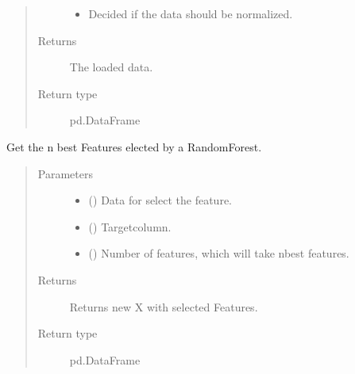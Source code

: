 \documentclass[letterpaper,10pt,english]{sphinxmanual}
\begin{document}
\begin{fulllineitems}
\begin{quote}
\begin{description}
\begin{itemize}
\item {} 
\sphinxAtStartPar
{} \textendash{} Decided if the data should be normalized.

\end{itemize}

\item[{Returns}] \leavevmode
\sphinxAtStartPar
The loaded data.

\item[{Return type}] \leavevmode
\sphinxAtStartPar
pd.DataFrame

\end{description}\end{quote}

\end{fulllineitems}


\begin{fulllineitems}
\label{\detokenize{anoog.io:anoog.io.data_io.model_based_feature_selection}}
\sphinxAtStartPar
Get the n best Features elected by a RandomForest.
\begin{quote}\begin{description}
\item[{Parameters}] \leavevmode\begin{itemize}
\item {} 
\sphinxAtStartPar
{} () \textendash{} Data for select the feature.

\item {} 
\sphinxAtStartPar
{} () \textendash{} Target\sphinxhyphen{}column.

\item {} 
\sphinxAtStartPar
{} (\sphinxstyleliteralemphasis{\sphinxupquote{, }}) \textendash{} Number of features, which will take n\sphinxhyphen{}best features.

\end{itemize}

\item[{Returns}] \leavevmode
\sphinxAtStartPar
Returns new X with selected Features.

\item[{Return type}] \leavevmode
\sphinxAtStartPar
pd.DataFrame

\end{description}\end{quote}

\end{fulllineitems}
\end{document}
